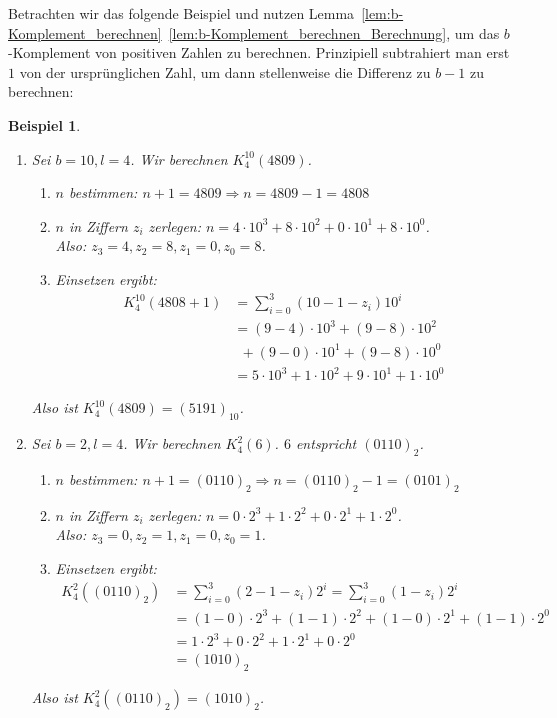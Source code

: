 \documentclass{article}
\newtheorem{beispiel}[satz]{Beispiel}
\begin{document}
  \vspace{\baselineskip}
  Betrachten wir das folgende Beispiel und nutzen Lemma~\ref{lem:b-Komplement_berechnen}~\ref{lem:b-Komplement_berechnen_Berechnung}, um das $b$-Komplement von positiven Zahlen zu berechnen.
  Prinzipiell subtrahiert man erst $1$ von der ursprünglichen Zahl, um dann stellenweise die Differenz zu $b-1$ zu berechnen:

  \begin{beispiel}
    \begin{enumerate}
      \item Sei $b=10, l=4$. Wir berechnen $K_4^{10}(4809)$.
        \begin{enumerate}
          \item $n$ bestimmen: $n+1 = 4809 \Rightarrow n = 4809 -1 = 4808$
          \item $n$ in Ziffern $z_i$ zerlegen: $n=4 \cdot 10^3 + 8 \cdot 10^2 + 0\cdot 10^1 + 8\cdot 10^0$. \\
           Also: $z_3 = 4, z_2 = 8, z_1 = 0, z_0 =8$.
          \item Einsetzen ergibt:
            \begin{align*}
              K_4^{10}(4808+1) &= \sum_{i=0}^3(10-1-z_i)10^i \\
              &= (9-4) \cdot 10^3 + (9-8) \cdot 10^2 \\ 
              &~~+ (9-0) \cdot 10^1 + (9-8) \cdot 10^0 \\
              &= 5 \cdot 10^3 + 1 \cdot 10^2 + 9 \cdot 10^1 + 1 \cdot 10^0
            \end{align*}
        \end{enumerate}
        Also ist $K_4^{10}(4809)=(5191)_{10}$.
      \item Sei $b=2, l=4$. Wir berechnen $K_4^2(6)$. $6$ entspricht $(0110)_2$.
        \begin{enumerate}
          \item $n$ bestimmen: $n+1 = (0110)_2 \Rightarrow n = (0110)_2 -1 = (0101)_2$
          \item $n$ in Ziffern $z_i$ zerlegen: $n=0 \cdot 2^3 + 1 \cdot 2^2 + 0\cdot 2^1 + 1\cdot 2^0$. \\
           Also: $z_3 = 0, z_2 = 1, z_1 = 0, z_0 =1$.
          \item Einsetzen ergibt:
            \begin{align*}
              K_4^2((0110)_2) &= \sum_{i=0}^3(2-1-z_i)2^i = \sum_{i=0}^3(1-z_i)2^i \\
              &= (1-0) \cdot 2^3 + (1-1) \cdot 2^2 + (1-0) \cdot 2^1 + (1-1) \cdot 2^0 \\
              &= 1 \cdot 2^3 + 0 \cdot 2^2 + 1\cdot 2^1 + 0\cdot 2^0 \\
              &= (1010)_2
            \end{align*}
        \end{enumerate}
        Also ist $K_4^2((0110)_2) = (1010)_2$.
    \end{enumerate}
  \end{beispiel}
\end{document}
